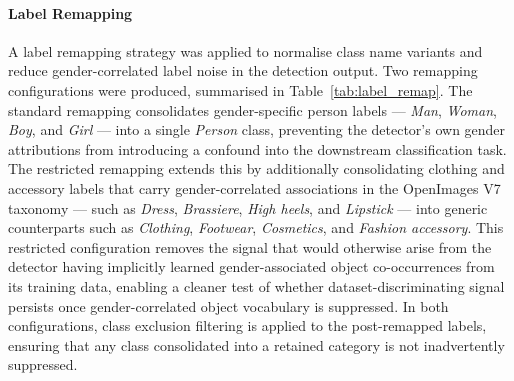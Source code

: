 \paragraph{Label Remapping}
A label remapping strategy was applied to normalise class name variants and 
reduce gender-correlated label noise in the detection output. Two remapping 
configurations were produced, summarised in Table~\ref{tab:label_remap}. The 
standard remapping consolidates gender-specific person labels — \textit{Man}, 
\textit{Woman}, \textit{Boy}, and \textit{Girl} — into a single \textit{Person} 
class, preventing the detector's own gender attributions from introducing a 
confound into the downstream classification task. The restricted remapping 
extends this by additionally consolidating clothing and accessory labels that 
carry gender-correlated associations in the OpenImages V7 taxonomy — such as 
\textit{Dress}, \textit{Brassiere}, \textit{High heels}, and \textit{Lipstick} 
— into generic counterparts such as \textit{Clothing}, \textit{Footwear}, 
\textit{Cosmetics}, and \textit{Fashion accessory}. This restricted 
configuration removes the signal that would otherwise arise from the detector 
having implicitly learned gender-associated object co-occurrences from its 
training data, enabling a cleaner test of whether dataset-discriminating signal 
persists once gender-correlated object vocabulary is suppressed. In both 
configurations, class exclusion filtering is applied to the post-remapped labels, 
ensuring that any class consolidated into a retained category is not 
inadvertently suppressed.

